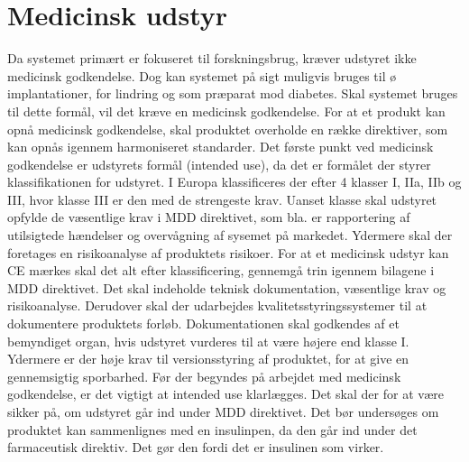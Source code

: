 \section{Medicinsk udstyr}
 Da systemet primært er fokuseret til forskningsbrug, kræver udstyret ikke medicinsk godkendelse. Dog kan systemet på sigt muligvis bruges til ø implantationer, for lindring og som præparat mod diabetes. Skal systemet bruges til dette formål, vil det kræve en medicinsk godkendelse. For at et produkt kan opnå medicinsk godkendelse, skal produktet overholde en række direktiver, som kan opnås igennem harmoniseret standarder. Det første punkt ved medicinsk godkendelse er udstyrets formål (intended use), da det er formålet der styrer klassifikationen for udstyret. I Europa klassificeres der efter 4 klasser I, IIa, IIb og III, hvor klasse III er den med de strengeste krav. Uanset klasse skal udstyret opfylde de væsentlige krav i MDD direktivet, som bla. er rapportering af utilsigtede hændelser og overvågning af sysemet på markedet. Ydermere skal der foretages en risikoanalyse af produktets risikoer. For at et medicinsk udstyr kan CE mærkes 
 skal det alt efter klassificering, gennemgå trin igennem bilagene i MDD direktivet. Det skal indeholde teknisk dokumentation, væsentlige krav og risikoanalyse. Derudover skal der udarbejdes kvalitetsstyringssystemer til at dokumentere produktets forløb. Dokumentationen skal godkendes af et bemyndiget organ, hvis udstyret vurderes til at være højere end klasse I. Ydermere er der høje krav til versionsstyring af produktet, for at give en gennemsigtig sporbarhed. Før der begyndes på arbejdet med medicinsk godkendelse, er det vigtigt at intended use klarlægges. Det skal der for at være sikker på, om udstyret går ind under MDD direktivet. Det bør undersøges om produktet kan sammenlignes med en insulinpen, da den går ind under det farmaceutisk direktiv. Det gør den fordi det er insulinen som virker. 